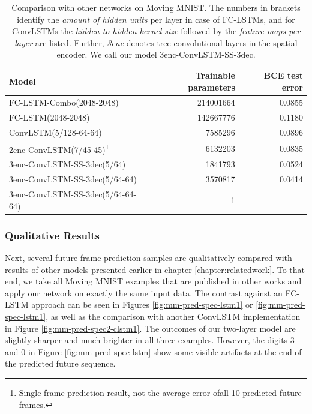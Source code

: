 \begin{table}[htb]
  \small
  \centering
  \begin{tabular}{l r r}
    \toprule
      \textbf{Model} & \textbf{Trainable parameters} & \textbf{BCE test error} \\
    \midrule
      FC-LSTM-Combo(2048-2048) \tiny{\parencite{unsup_learn_lstm}} & \num{214001664} & 0.0855 \\
      FC-LSTM(2048-2048) \tiny{\parencite{conv_lstm_nowcasting}} & \num{142667776} & 0.1180 \\
      ConvLSTM(5/128-64-64) \tiny{\parencite{conv_lstm_nowcasting}} & \num{7585296} & 0.0896 \\
      2enc-ConvLSTM(7/45-45)\footnote{Single frame prediction result, not the average error ofall 10 predicted future frames.} \tiny{\parencite{spat_temp_video_autoenc}} & \num{6132203} & 0.0835 \\
    \midrule
      3enc-ConvLSTM-SS-3dec(5/64) & \num{1841793} & 0.0524 \\
      3enc-ConvLSTM-SS-3dec(5/64-64) & \num{3570817} & 0.0414 \\
      3enc-ConvLSTM-SS-3dec(5/64-64-64) & \num{1} & \\ %
    \bottomrule
  \end{tabular}
  \caption[Results on Moving MNIST]{Comparison with other networks on Moving MNIST. The numbers in brackets identify the \textit{amount of hidden units} per layer in case of FC-LSTMs, and for ConvLSTMs the \textit{hidden-to-hidden kernel size} followed by the \textit{feature maps per layer} are listed. Further, \textit{3enc} denotes tree convolutional layers in the spatial encoder. We call our model 3enc-ConvLSTM-SS-3dec.}\label{tab:mm-comparison}
\end{table}

\subsubsection{Qualitative Results}

Next, several future frame prediction samples are qualitatively compared with results of other models presented earlier in chapter \ref{chapter:relatedwork}. To that end, we take all Moving MNIST examples that are published in other works and apply our network on exactly the same input data. The contrast against an FC-LSTM approach can be seen in Figures \ref{fig:mm-pred-spec-lstm1} or \ref{fig:mm-pred-spec-lstm1}, as well as the comparison with another ConvLSTM implementation in Figure \ref{fig:mm-pred-spec2-clstm1}. The outcomes of our two-layer model are slightly sharper and much brighter in all three examples. However, the digits \num{3} and \num{0} in Figure \ref{fig:mm-pred-spec-lstm} show some visible artifacts at the end of the predicted future sequence.

